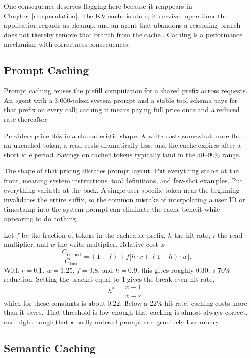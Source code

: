 One consequence deserves flagging here because it reappears in
Chapter~\ref{ch:speculation}. The KV cache is state, it survives operations the
application regards as cleanup, and an agent that abandons a reasoning branch
does not thereby remove that branch from the cache \cite{abortedkv2026}. Caching
is a performance mechanism with correctness consequences.

\subsection{Prompt Caching}

Prompt caching reuses the prefill computation for a shared prefix across
requests. An agent with a 3{,}000-token system prompt and a stable tool schema
pays for that prefix on every call; caching it means paying full price once and a
reduced rate thereafter.

Providers price this in a characteristic shape. A write costs somewhat more than an uncached token, a read costs dramatically less, and the cache expires after a
short idle period. Savings on cached tokens typically land in the 50--90\% range.

The shape of that pricing dictates prompt layout. Put everything stable at the front, meaning system instructions, tool definitions, and few-shot examples. Put everything variable at the back. A single user-specific token near the beginning
invalidates the entire suffix, so the common mistake of interpolating a user ID
or timestamp into the system prompt can eliminate the cache benefit while
appearing to do nothing.

Let $f$ be the fraction of tokens in the cacheable prefix, $h$ the hit rate,
$r$ the read multiplier, and $w$ the write multiplier. Relative cost is
\[
\frac{C_{\text{cached}}}{C_{\text{base}}}
= (1-f) + f\big[h \cdot r + (1-h)\cdot w\big].
\]
With $r = 0.1$, $w = 1.25$, $f = 0.8$, and $h = 0.9$, this gives roughly $0.30$:
a 70\% reduction. Setting the bracket equal to 1 gives the break-even hit rate,
\[
h^{*} = \frac{w-1}{w-r},
\]
which for these constants is about $0.22$. Below a 22\% hit rate, caching costs
more than it saves. That threshold is low enough that caching is almost always
correct, and high enough that a badly ordered prompt can genuinely lose money.

\subsection{Semantic Caching}

